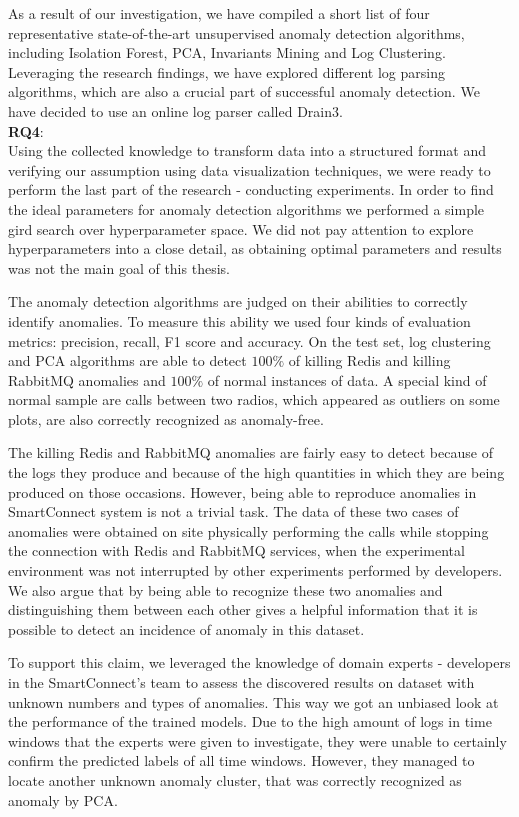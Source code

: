 As a result of our investigation, we have compiled a short list of four representative state-of-the-art unsupervised anomaly detection algorithms, including Isolation Forest, PCA, Invariants Mining and Log Clustering. Leveraging the research findings, we have explored different log parsing algorithms, which are also a crucial part of successful anomaly detection. We have decided to use an online log parser called Drain3.\\

\textbf{RQ4}: \textit{\RQFourth}\\

Using the collected knowledge to transform data into a structured format and verifying our assumption using data visualization techniques, we were ready to perform the last part of the research - conducting experiments. In order to find the ideal parameters for anomaly detection algorithms we performed a simple gird search over hyperparameter space. We did not pay attention to explore hyperparameters into a close detail, as obtaining optimal parameters and results was not the main goal of this thesis. 

The anomaly detection algorithms are judged on their abilities to correctly identify anomalies. To measure this ability we used four kinds of evaluation metrics: precision, recall, F1 score and accuracy. On the test set, log clustering and PCA algorithms are able to detect $100 \%$ of killing Redis and killing RabbitMQ anomalies and $100 \%$ of normal instances of data. A special kind of normal sample are calls between two radios, which appeared as outliers on some plots, are also correctly recognized as anomaly-free. 

The killing Redis and RabbitMQ anomalies are fairly easy to detect because of the logs they produce and because of the high quantities in which they are being produced on those occasions. However, being able to reproduce anomalies in SmartConnect system is not a trivial task. The data of these two cases of anomalies were obtained on site physically performing the calls while stopping the connection with Redis and RabbitMQ services, when the experimental environment was not interrupted by other experiments performed by developers. 
We also argue that by being able to recognize these two anomalies and distinguishing them between each other gives a helpful information that it is possible to detect an incidence of anomaly in this dataset. 

To support this claim, we leveraged the knowledge of domain experts - developers in the SmartConnect's team to assess the discovered results on dataset with unknown numbers and types of anomalies. This way we got an unbiased look at the performance of the trained models. Due to the high amount of logs in time windows that the experts were given to investigate, they were unable to certainly confirm the predicted labels of all time windows. However, they managed to locate another unknown anomaly cluster, that was correctly recognized as anomaly by PCA. 
